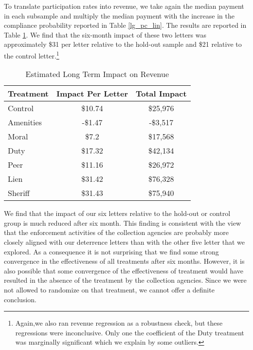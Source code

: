 \documentclass[12pt]{article}
\begin{document}
To translate participation rates into revenue, we take again the
median payment in each subsample and multiply the median payment with
the increase in the compliance probability reported in Table
\ref{lg_pc_lin}.  The results are reported in Table \ref{lg_rev}. We
find that the six-month impact of these two letters was approximately
\$31 per letter relative to the hold-out sample and \$21 relative to
the control letter.\footnote{Again,we also ran revenue regression as a 
robustness check, but these regressions were inconclusive. Only one 
the coefficient of the Duty treatment was marginally significant which we
explain by some outliers.}

\begin{table}[htbp]
\caption{Estimated Long Term Impact on Revenue} \label{lg_rev}
\bigskip
\centering
\begin{tabular}{lcc}
  \hline
Treatment & Impact Per Letter & Total Impact \\ 
  \hline
Control & \$10.74 & \$25,976 \\ 
  Amenities & -\$1.47 & -\$3,517 \\ 
  Moral & \$7.2 & \$17,568 \\ 
  Duty & \$17.32 & \$42,134 \\ 
  Peer & \$11.16 & \$26,972 \\ 
  Lien & \$31.42 & \$76,328 \\ 
  Sheriff & \$31.43 & \$75,940 \\ 
   \hline
\end{tabular}
\end{table}

We find that the impact of our six letters relative to the hold-out or
control group is much reduced after six month. This finding is
consistent with the view that the enforcement activities of the
collection agencies are probably more closely aligned with our
deterrence letters than with the other five letter that we
explored. As a consequence it is not surprising that we find some
strong convergence in the effectiveness of all treatments after six
months. However, it is also possible that some convergence of the
effectiveness of treatment would have resulted in the absence of the
treatment by the collection agencies. Since we were not allowed to
randomize on that treatment, we cannot offer a definite conclusion.
\end{document}
